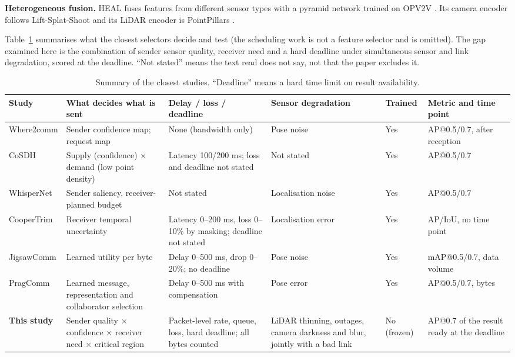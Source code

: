 \documentclass[conference]{IEEEtran}
\begin{document}
\textbf{Heterogeneous fusion.} HEAL \cite{lu2024heal} fuses features from different sensor types with a pyramid network trained on OPV2V \cite{xu2022opv2v}. Its camera encoder follows Lift-Splat-Shoot \cite{philion2020} and its LiDAR encoder is PointPillars \cite{lang2019}.

Table~\ref{tab:related} summarises what the closest selectors decide and test (the scheduling work \cite{zhu2026,wu2025fresh} is not a feature selector and is omitted). The gap examined here is the combination of sender sensor quality, receiver need and a hard deadline under simultaneous sensor and link degradation, scored at the deadline. ``Not stated'' means the text read does not say, not that the paper excludes it.

\begin{table}[t]
\caption{Summary of the closest studies. ``Deadline'' means a hard time limit on result availability.}\label{tab:related}
\centering\scriptsize\setlength{\tabcolsep}{3pt}
\begin{tabular}{>{\raggedright\arraybackslash}p{2.55cm}>{\raggedright\arraybackslash}p{3.5cm}>{\raggedright\arraybackslash}p{3.35cm}>{\raggedright\arraybackslash}p{2.0cm}>{\raggedright\arraybackslash}p{1.5cm}>{\raggedright\arraybackslash}p{3.35cm}}
\toprule
Study & What decides what is sent & Delay / loss / deadline & Sensor degradation & Trained & Metric and time point\\\midrule
Where2comm \cite{hu2022where2comm} & Sender confidence map; request map & None (bandwidth only) & Pose noise & Yes & AP@0.5/0.7, after reception\\
CoSDH \cite{xu2025cosdh} & Supply (confidence) $\times$ demand (low point density) & Latency 100/200 ms; loss and deadline not stated & Not stated & Yes & AP@0.5/0.7\\
WhisperNet \cite{chen2026whisper} & Sender saliency, receiver-planned budget & Not stated & Localisation noise & Yes & AP@0.5/0.7\\
CooperTrim \cite{mukhopadhyay2026} & Receiver temporal uncertainty & Latency 0--200 ms, loss 0--10\% by masking; deadline not stated & Localisation error & Yes & AP/IoU, no time point\\
JigsawComm \cite{wang2025jigsaw} & Learned utility per byte & Delay 0--500 ms, drop 0--20\%; no deadline & Pose noise & Yes & mAP@0.5/0.7, data volume\\
PragComm \cite{hu2026prag} & Learned message, representation and collaborator selection & Delay 0--500 ms with compensation & Pose error & Yes & AP@0.5/0.7, bytes\\
\textbf{This study} & Sender quality $\times$ confidence $\times$ receiver need $\times$ critical region & Packet-level rate, queue, loss, hard deadline; all bytes counted & LiDAR thinning, outages, camera darkness and blur, jointly with a bad link & No (frozen) & AP@0.7 of the result ready at the deadline\\
\bottomrule
\end{tabular}
\end{table}
\end{document}
